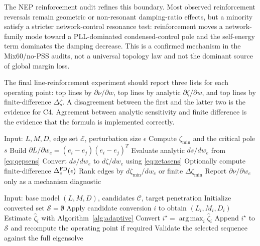 \documentclass[journal]{IEEEtran}
\newcommand{\argmax}{\operatorname*{arg\,max}}
\begin{document}
The NEP reinforcement audit refines this boundary. Most observed reinforcement reversals remain geometric or non-resonant damping-ratio effects, but a minority satisfy a stricter network-control resonance test: reinforcement moves a network-family mode toward a PLL-dominated condensed-control pole and the self-energy term dominates the damping decrease. This is a confirmed mechanism in the Mix60/no-PSS audits, not a universal topology law and not the dominant source of global margin loss.

The final line-reinforcement experiment should report three lists for each operating point: top lines by $\partial\nu/\partial w$, top lines by analytic $\partial\zeta/\partial w$, and top lines by finite-difference $\Delta\zeta$. A disagreement between the first and the latter two is the evidence for C4. Agreement between analytic sensitivity and finite difference is the evidence that the formula is implemented correctly.

\begin{algorithm}[t]
\caption{Damping-aware line ranking}
\label{alg:line}
\begin{algorithmic}[1]
\STATE Input: $L,M,D$, edge set $\mathcal{E}$, perturbation size $\epsilon$
\STATE Compute $\zeta_{\min}$ and the critical pole $s$
\STATE Build $\partial L/\partial w_e=(e_i-e_j)(e_i-e_j)^T$
\STATE Evaluate analytic $ds/dw_e$ from \eqref{eq:qepsens}
\STATE Convert $ds/dw_e$ to $d\zeta/dw_e$ using \eqref{eq:zetasens}
\STATE Optionally compute finite-difference $\Delta_e^{\rm FD}(\epsilon)$
\ENDFOR
\STATE Rank edges by $d\zeta_{\min}/dw_e$ or finite $\Delta\zeta_{\min}$
\STATE Report $\partial\nu/\partial w_e$ only as a mechanism diagnostic
\end{algorithmic}
\end{algorithm}

\begin{algorithm}[t]
\caption{Greedy SG-to-IBR conversion screening}
\label{alg:conversion}
\begin{algorithmic}[1]
\STATE Input: base model $(L,M,D)$, candidates $\mathcal{C}$, target penetration
\STATE Initialize converted set $\mathcal{S}=\emptyset$
\STATE Apply candidate conversion $i$ to obtain $(L_i,M_i,D_i)$
\STATE Estimate $\widehat{\zeta}_i$ with Algorithm~\ref{alg:adaptive}
\ENDFOR
\STATE Convert $i^\star=\argmax_i\widehat{\zeta}_i$
\STATE Append $i^\star$ to $\mathcal{S}$ and recompute the operating point if required
\ENDWHILE
\STATE Validate the selected sequence against the full eigensolve
\end{algorithmic}
\end{algorithm}
\end{document}
